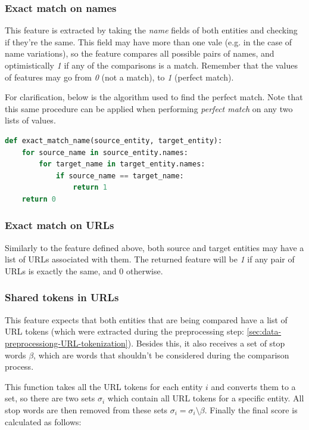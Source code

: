 \documentclass[epsfig,a4paper,11pt,titlepage,twoside,openany]{book}
\begin{document}
\subsubsection{Exact match on names}
\label{sec:feature-exact-match-names}

This feature is extracted by taking the \textit{name} fields of both entities and checking if they're the same. This field may have more than one vale (e.g. in the case of name variations), so the feature compares all possible pairs of names, and optimistically \textit{1} if any of the comparisons is a match. Remember that the values of features may go from \textit{0} (not a match), to \textit{1} (perfect match). 

For clarification, below is the algorithm used to find the perfect match. Note that this same procedure can be applied when performing \textit{perfect match} on any two lists of values.

\begin{lstlisting}[language=Python]
def exact_match_name(source_entity, target_entity):
    for source_name in source_entity.names:
        for target_name in target_entity.names:
            if source_name == target_name:
                return 1
    return 0
\end{lstlisting}


\subsubsection{Exact match on URLs}
\label{sec:feature-exact-match-urls}

Similarly to the feature defined above, both source and target entities may have a list of URLs associated with them. The returned feature will be \textit{1} if any pair of URLs is exactly the same, and 0 otherwise.

\subsubsection{Shared tokens in URLs}
\label{sec:feature-shared-tokens-plus-urls}

This feature expects that both entities that are being compared have a list of URL tokens (which were extracted during the preprocessing step: \autoref{sec:data-preprocessiong-URL-tokenization}). Besides this, it also receives a set of stop words $\beta$, which are words that shouldn't be considered during the comparison process.

This function takes all the URL tokens for each entity $i$ and converts them to a set, so there are two sets $\sigma_i$ which contain all URL tokens for a specific entity. All stop words are then removed from these sets $\sigma_i = \sigma_i \setminus \beta$. Finally the final score is calculated as follows:
\end{document}
